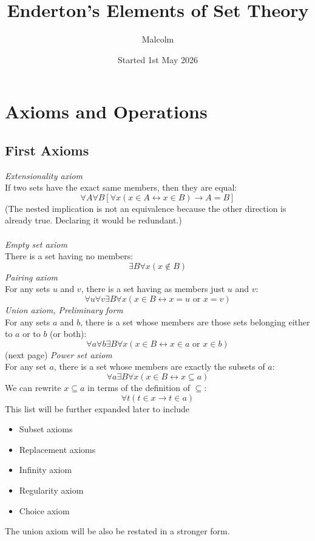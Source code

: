 \documentclass{report}
\title{Enderton's Elements of Set Theory}
\date{Started 1st May 2026}
\author{Malcolm}
\begin{document}
\maketitle

\tableofcontents

\chapter{Axioms and Operations}
\section{First Axioms}
\textit{Extensionality axiom}\\
If two sets have the exact same members, then they are equal:
\begin{equation*}
\forall A\forall B[\forall x(x\in A\leftrightarrow x\in B)\to A=B]
\end{equation*}
(The nested implication is not an equivalence because the other direction is already true. Declaring it would be redundant.)\\
\vspace{1mm}\\
\textit{Empty set axiom}\\
There is a set having no members:
\begin{equation*}
\exists B\forall x(x\notin B)
\end{equation*}
\textit{Pairing axiom}\\
For any sets $u$ and $v$, there is a set having as members just $u$ and $v$:
\begin{equation*}
\forall u\forall v\exists B\forall x(x\in B\leftrightarrow x=u\text{ or }x=v)
\end{equation*}
\textit{Union axiom, Preliminary form}\\
For any sets $a$ and $b$, there is a set whose members are those sets belonging either to $a$ or to $b$ (or both):
\begin{equation*}
\forall a\forall b\exists B\forall x(x\in B\leftrightarrow x\in a\text{ or }x\in b)
\end{equation*}
(next page)\newpage
\noindent\textit{Power set axiom}\\
For any set $a$, there is a set whose members are exactly the subsets of $a$:
\begin{equation*}
\forall a\exists B\forall x(x\in B\leftrightarrow x\subseteq a)
\end{equation*}
We can rewrite $x\subseteq a$ in terms of the definition of $\subseteq$:
\begin{equation*}
\forall t(t\in x\to t\in a)
\end{equation*}
This list will be further expanded later to include
\begin{itemize}
\item Subset axioms
\item Replacement axioms
\item Infinity axiom
\item Regularity axiom
\item Choice axiom
\end{itemize}
The union axiom will be also be restated in a stronger form.
\newpage
\end{document}
